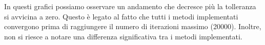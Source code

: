 In questi grafici possiamo osservare un andamento che decresce più la tolleranza
si avvicina a zero. Questo è legato al fatto che tutti i metodi implementati
convergono prima di raggiungere il numero di iterazioni massimo (20000). Inoltre,
non si riesce a notare una differenza significativa tra i metodi implementati.